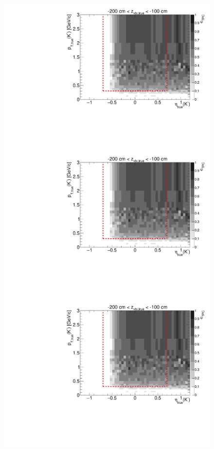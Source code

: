\begin{figure}[hb]
{  \includegraphics[width=\linewidth,page=6]{graphics/eff/Eff2D_TPC_kaon_Minus.pdf}\\
  \includegraphics[width=\linewidth,page=8]{graphics/eff/Eff2D_TPC_kaon_Minus.pdf}\\
  \includegraphics[width=\linewidth,page=10]{graphics/eff/Eff2D_TPC_kaon_Minus.pdf}
}%
\end{figure}
